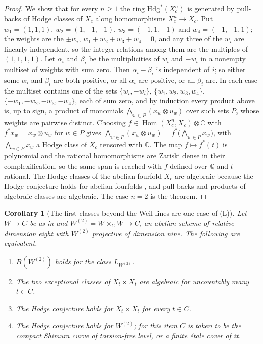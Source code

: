 \documentclass[11pt,reqno]{amsart}
\theoremstyle{plain}
\newtheorem{corollary}[theorem]{Corollary}
\theoremstyle{definition}
\theoremstyle{remark}
\newcommand{\QQ}{\mathbb{Q}}
\newcommand{\CC}{\mathbb{C}}
\newcommand{\Hdg}{\mathrm{Hdg}}
\DeclareMathOperator{\Hom}{Hom}
\begin{document}
\begin{proof}
We show that for every $n\ge1$ the ring $\Hdg^{*}(X_{c}^{n})$ is generated by
pull-backs of Hodge classes of $X_{c}$ along homomorphisms $X_{c}^{n}\to
X_{c}$. Put $w_{1}=(1,1,1)$, $w_{2}=(1,-1,-1)$, $w_{3}=(-1,1,-1)$ and
$w_{4}=(-1,-1,1)$; the weights are the $\pm w_{i}$,
$w_{1}+w_{2}+w_{3}+w_{4}=0$, and any three of the $w_{i}$ are linearly
independent, so the integer relations among them are the multiples of
$(1,1,1,1)$. Let $\alpha_{i}$ and $\beta_{i}$ be the multiplicities of $w_{i}$
and $-w_{i}$ in a nonempty multiset of weights with sum zero. Then
$\alpha_{i}-\beta_{i}$ is independent of $i$; so either some $\alpha_{i}$ and
$\beta_{i}$ are both positive, or all $\alpha_{i}$ are positive, or all
$\beta_{i}$ are. In each case the multiset contains one of the sets
$\{w_{i},-w_{i}\}$, $\{w_{1},w_{2},w_{3},w_{4}\}$,
$\{-w_{1},-w_{2},-w_{3},-w_{4}\}$, each of sum zero, and by induction every
product above is, up to sign, a product of monomials
$\bigwedge_{w\in P}(x_{w}\otimes u_{w})$ over such sets $P$, whose weights are
pairwise distinct. Choosing $f\in\Hom(X_{c}^{n},X_{c})\otimes\CC$ with
$f^{*}x_{w}=x_{w}\otimes u_{w}$ for $w\in P$ gives
$\bigwedge_{w\in P}(x_{w}\otimes u_{w})=f^{*}\bigl(\bigwedge_{w\in P}x_{w}\bigr)$,
with $\bigwedge_{w\in P}x_{w}$ a Hodge class of $X_{c}$ tensored with $\CC$.
The map $f\mapsto f^{*}(t)$ is polynomial and the rational homomorphisms are
Zariski dense in their complexification, so the same span is reached with $f$
defined over $\QQ$ and $t$ rational. The Hodge classes of the abelian fourfold
$X_{c}$ are algebraic because the Hodge conjecture holds for abelian fourfolds
\cite{Mar25a}, and pull-backs and products of algebraic classes are
algebraic. The case $n=2$ is the theorem.
\end{proof}

\begin{corollary}[The first classes beyond the Weil lines are one case of
\textup{(L)}]\label{cor:mumfordequiv}
Let $W\to C$ be as in  and
$W^{(2)}=W\times_{C}W\to C$, an abelian scheme of relative dimension eight
with $W^{(2)}$ projective of dimension nine. The following are equivalent.
\begin{enumerate}[label=\textup{(\alph*)},leftmargin=2.6em,itemsep=2pt]
\item $B(W^{(2)})$ holds for the class $L_{W^{(2)}}$.
\item The two exceptional classes of $X_{t}\times X_{t}$ are algebraic for
  uncountably many $t\in C$.
\item The Hodge conjecture holds for $X_{t}\times X_{t}$ for every $t\in C$.
\item The Hodge conjecture holds for $W^{(2)}$; for this item $C$ is taken to
  be the compact Shimura curve of torsion-free level, or a finite \'etale
  cover of it.
\end{enumerate}
\end{corollary}
\end{document}
